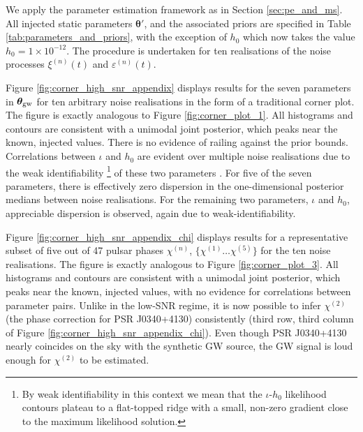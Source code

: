 \documentclass[fleqn,usenatbib,useAMS]{mnras}
\begin{document}
We apply the parameter estimation framework as in Section \ref{sec:pe_and_ms}. All injected static parameters $\boldsymbol{\theta}'$, and the associated priors are specified in Table \ref{tab:parameters_and_priors}, with the exception of $h_0$ which now takes the value $h_0 = 1 \times 10^{-12}$. The procedure is undertaken for ten realisations of the noise processes $\xi^{(n)}(t)$ and $\varepsilon^{(n)}(t)$. \newline 


Figure \ref{fig:corner_high_snr_appendix} displays results for the seven parameters in $\boldsymbol{\theta}_{\rm gw}$ for ten arbitrary noise realisations in the form of a traditional corner plot. The figure is exactly analogous to Figure \ref{fig:corner_plot_1}. All histograms and contours are consistent with a unimodal joint posterior, which peaks near the known, injected values. There is no evidence of railing against the prior bounds. Correlations between $\iota$ and $h_0$ are evident over multiple noise realisations due to the weak identifiability \footnote{By weak identifiability in this context we mean that the $\iota$-$h_0$ likelihood contours plateau to a flat-topped ridge with a small, non-zero gradient close to the maximum likelihood solution.} of these two parameters \citep{e5be7c83a0d24500826f6e1b414d1733}. For five of the seven parameters, there is effectively zero dispersion in the one-dimensional posterior medians between noise realisations. For the remaining two parameters, $\iota$ and $h_0$, appreciable dispersion is observed, again due to weak-identifiability. \newline 


Figure \ref{fig:corner_high_snr_appendix_chi} displays results for a representative subset of five out of 47 pulsar phases $\chi^{(n)}$, $ \{\chi^{(1)} \dots \chi^{(5)} \}$ for the ten noise realisations. The figure is exactly analogous to Figure \ref{fig:corner_plot_3}. All histograms and contours are consistent with a unimodal joint posterior, which peaks near the known, injected values, with no evidence for correlations between parameter pairs. Unlike in the low-SNR regime, it is now possible to infer $\chi^{(2)}$ (the phase correction for PSR J0340+4130) consistently (third row, third column of Figure \ref{fig:corner_high_snr_appendix_chi}). Even though PSR J0340+4130 nearly coincides on the sky with the synthetic GW source, the GW signal is loud enough for $\chi^{(2)}$ to be estimated.
\end{document}
